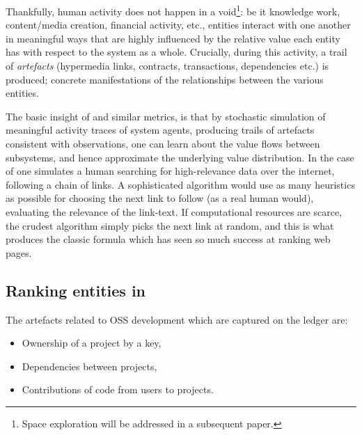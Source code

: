 Thankfully, human activity does not happen in a void\footnote{Space
  exploration will be addressed in a subsequent paper.}: be it
knowledge work, content/media creation, financial activity, etc.,
entities interact with one another in meaningful ways that are highly
influenced by the relative value each entity has with respect to the
system as a whole. Crucially, during this activity, a trail of
\emph{artefacts} (hypermedia links, contracts, transactions,
dependencies etc.) is produced; concrete manifestations
of the relationships between the various entities.


The basic insight of \pagerank{} and similar metrics, is that by
stochastic simulation of meaningful activity traces of system agents,
producing trails of artefacts consistent with observations, one can
learn about the value flows between subsystems, and hence approximate
the underlying value distribution. In the case of \pagerank{} one
simulates a human searching for high-relevance data over the internet,
following a chain of links. A sophisticated algorithm would use as
many heuristics as possible for choosing the next link to follow (as a
real human would), \eg{} evaluating the relevance of the link-text. If
computational resources are scarce, the crudest algorithm simply picks
the next link at random, and this is what produces the classic
\pagerank{} formula which has seen so much success at ranking web
pages.

\subsection{Ranking entities in \oscoin{}}
\label{s:netgraph}

The artefacts related to OSS development which are captured on the \oscoin{}
ledger are:
\begin{itemize}
  \item Ownership of a project by a key,
  \item Dependencies between projects,
  \item Contributions of code from users to projects.
\end{itemize}

\begin{center}
\end{center}


